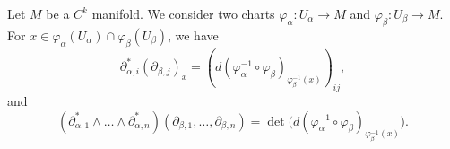 \begin{lemma}		\label{LEMooSZTOooBIzMCc}
	Let \( M\) be a \( C^k\) manifold. We consider two charts \(\varphi_{\alpha} \colon U_{\alpha}\to M  \) and \(\varphi_{\beta} \colon U_{\beta}\to M  \). For \( x\in \varphi_{\alpha}(U_{\alpha})\cap \varphi_{\beta}(U_{\beta})\), we have
	\begin{equation}		\label{EQooQNRRooKkCkLE}
		\partial^*_{\alpha,i}(\partial_{\beta,j})_x=(d(\varphi_{\alpha}^{-1}\circ \varphi_{\beta})_{\varphi_{\beta}^{-1}(x)})_{ij},
	\end{equation}
	and
	\begin{equation}		\label{EQooAGFKooWwWdAf}
		(\partial_{\alpha, 1}^*\wedge\ldots \wedge\partial_{\alpha,n}^*)(\partial_{\beta,1},\ldots,\partial_{\beta,n})=\det\big( d(\varphi_{\alpha}^{-1}\circ\varphi_{\beta})_{\varphi_{\beta}^{-1}(x)} \big).
	\end{equation}
\end{lemma}

